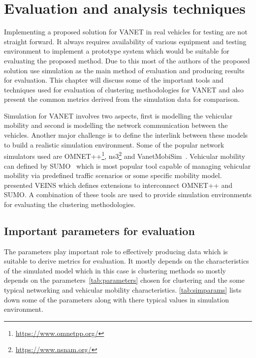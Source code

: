 \documentclass[]{ccs-thesis}
\begin{document}
\chapter{Evaluation and analysis techniques}
\label{sec:evaluation}

Implementing a proposed solution for \ac{VANET} in real vehicles for testing are not straight forward.
It always requires availability of various equipment and testing environment to implement a prototype system which
would be suitable for evaluating the proposed method. Due to this most of the authors of the proposed solution use
simulation as the main method of evaluation and producing results for evaluation. This chapter will discuss some of
the important tools and techniques used for evaluation of clustering methodologies for \ac{VANET} and also present
the common metrics derived from the simulation data for comparison.


Simulation for \ac{VANET} involves two aspects, first is modelling the vehicular mobility and second is modelling the
network communication between the vehicles. Another major challenge is to define the interlink between these models
to build a realistic simulation environment. Some of the popular network simulators used are OMNET++\footnote{\url{https://www.omnetpp.org/}},
ns3\footnote{\url{https://www.nsnam.org/}} and VanetMobiSim~\cite{4127230}. Vehicular mobility can defined by SUMO~\cite{dlr71460}
which is most popular tool capable of managing vehicular mobility via predefined traffic scenarios or some specific mobility model.
\textcite{sommer2011bidirectionally} presented \ac{VEINS} which defines extensions to interconnect OMNET++ and SUMO. A combination of
these tools are used to provide simulation environments for evaluating the clustering methodologies.

\section{Important parameters for evaluation}

The parameters play important role to effectively producing data which is suitable to derive metrics for evaluation.
It mostly depends on the characteristics of the simulated model which in this case is clustering methods so mostly depends
on the parameters~\cref{tab:parameters} chosen for clustering and the some typical networking and vehicular mobility
characteristics. \cref{tab:simparams} lists down some of the parameters along with there typical values in simulation environment.
\end{document}
